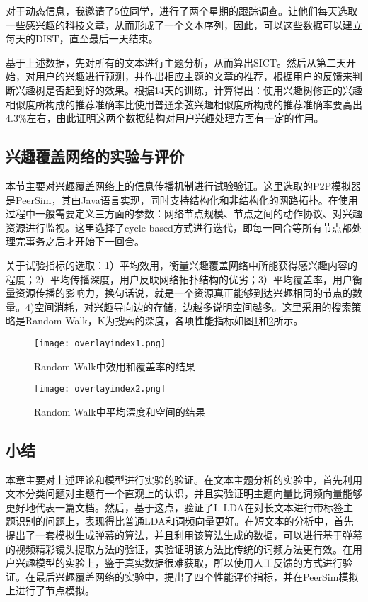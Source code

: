 对于动态信息，我邀请了5位同学，进行了两个星期的跟踪调查。让他们每天选取一些感兴趣的科技文章，从而形成了一个文本序列，因此，可以这些数据可以建立每天的DIST，直至最后一天结束。

基于上述数据，先对所有的文本进行主题分析，从而算出SICT。然后从第二天开始，对用户的兴趣进行预测，并作出相应主题的文章的推荐，根据用户的反馈来判断兴趣树是否起到好的效果。根据14天的训练，计算得出：使用兴趣树修正的兴趣相似度所构成的推荐准确率比使用普通余弦兴趣相似度所构成的推荐准确率要高出4.3\%左右，由此证明这两个数据结构对用户兴趣处理方面有一定的作用。

\subsection{兴趣覆盖网络的实验与评价}
本节主要对兴趣覆盖网络上的信息传播机制进行试验验证。这里选取的P2P模拟器是PeerSim，其由Java语言实现，同时支持结构化和非结构化的网路拓扑。在使用过程中一般需要定义三方面的参数：网络节点规模、节点之间的动作协议、对兴趣资源进行监视。这里选择了cycle-based方式进行迭代，即每一回合等所有节点都处理完事务之后才开始下一回合。

关于试验指标的选取：1）平均效用，衡量兴趣覆盖网络中所能获得感兴趣内容的程度；2）平均传播深度，用户反映网络拓扑结构的优劣；3）平均覆盖率，用户衡量资源传播的影响力，换句话说，就是一个资源真正能够到达兴趣相同的节点的数量。4)空间消耗，对兴趣导向边的存储，边越多说明空间越多。这里采用的搜索策略是Random Walk，K为搜索的深度，各项性能指标如图\ref{fig:overlayindex1}和\ref{fig:overlayindex2}所示。

\begin{figure}[!ht]
\centering
\texttt{[image: overlayindex1.png]}
\caption{Random Walk中效用和覆盖率的结果}
\label{fig:overlayindex1}
\end{figure}

\begin{figure}[!ht]
\centering
\texttt{[image: overlayindex2.png]}
\caption{Random Walk中平均深度和空间的结果}
\label{fig:overlayindex2}
\end{figure}

\subsection{小结}
本章主要对上述理论和模型进行实验的验证。在文本主题分析的实验中，首先利用文本分类问题对主题有一个直观上的认识，并且实验证明主题向量比词频向量能够更好地代表一篇文档。然后，基于这点，验证了L-LDA在对长文本进行带标签主题识别的问题上，表现得比普通LDA和词频向量更好。在短文本的分析中，首先提出了一套模拟生成弹幕的算法，并且利用该算法生成的数据，可以进行基于弹幕的视频精彩镜头提取方法的验证，实验证明该方法比传统的词频方法更有效。在用户兴趣模型的实验上，鉴于真实数据很难获取，所以使用人工反馈的方式进行验证。在最后兴趣覆盖网络的实验中，提出了四个性能评价指标，并在PeerSim模拟上进行了节点模拟。


